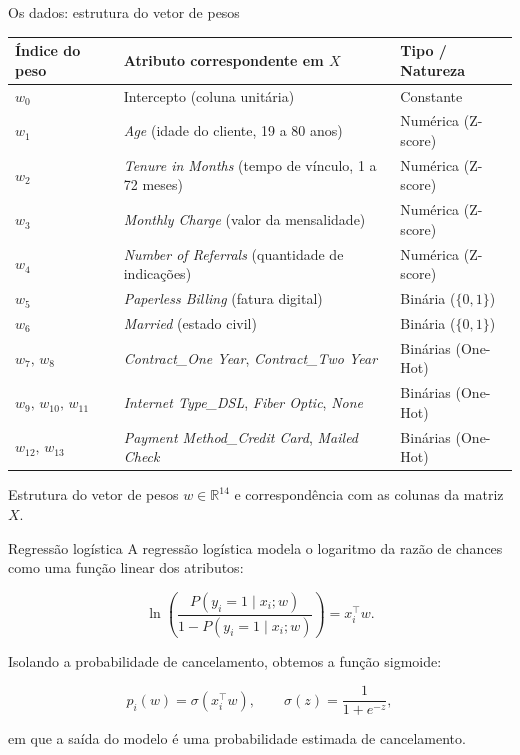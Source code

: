 \documentclass[aspectratio=169,11pt]{beamer}
\begin{document}
\begin{frame}{Os dados: estrutura do vetor de pesos}
\small
\centering
\renewcommand{\arraystretch}{1.15}
\begin{tabular}{@{}l p{8.2cm} l@{}}
\hline
\textbf{Índice do peso} & \textbf{Atributo correspondente em $X$} & \textbf{Tipo / Natureza} \\ \hline
$w_0$ & Intercepto (coluna unitária) & Constante \\
$w_1$ & \textit{Age} (idade do cliente, 19 a 80 anos) & Numérica (Z-score) \\
$w_2$ & \textit{Tenure in Months} (tempo de vínculo, 1 a 72 meses) & Numérica (Z-score) \\
$w_3$ & \textit{Monthly Charge} (valor da mensalidade) & Numérica (Z-score) \\
$w_4$ & \textit{Number of Referrals} (quantidade de indicações) & Numérica (Z-score) \\
$w_5$ & \textit{Paperless Billing} (fatura digital) & Binária ($\{0,1\}$) \\
$w_6$ & \textit{Married} (estado civil) & Binária ($\{0,1\}$) \\
$w_7,\,w_8$ & \textit{Contract\_One Year}, \textit{Contract\_Two Year} & Binárias (One-Hot) \\
$w_9,\,w_{10},\,w_{11}$ & \textit{Internet Type\_DSL}, \textit{Fiber Optic}, \textit{None} & Binárias (One-Hot) \\
$w_{12},\,w_{13}$ & \textit{Payment Method\_Credit Card}, \textit{Mailed Check} & Binárias (One-Hot) \\ \hline
\end{tabular}

\vspace{3mm}
\raggedright\footnotesize Estrutura do vetor de pesos $w\in\mathbb{R}^{14}$ e correspondência com as colunas da matriz $X$.
\end{frame}

\begin{frame}{Regressão logística}
A regressão logística modela o logaritmo da razão de chances como uma função linear dos atributos:

\[
\ln\left(
\frac{P(y_i=1\mid x_i;w)}
{1-P(y_i=1\mid x_i;w)}
\right)=x_i^\top w.
\]

Isolando a probabilidade de cancelamento, obtemos a função sigmoide:

\[
\hat p_i(w)=\sigma(x_i^\top w),
\qquad
\sigma(z)=\frac{1}{1+e^{-z}},
\]

\vspace{2mm}
em que a saída do modelo é uma probabilidade estimada de cancelamento.
\end{frame}
\end{document}
